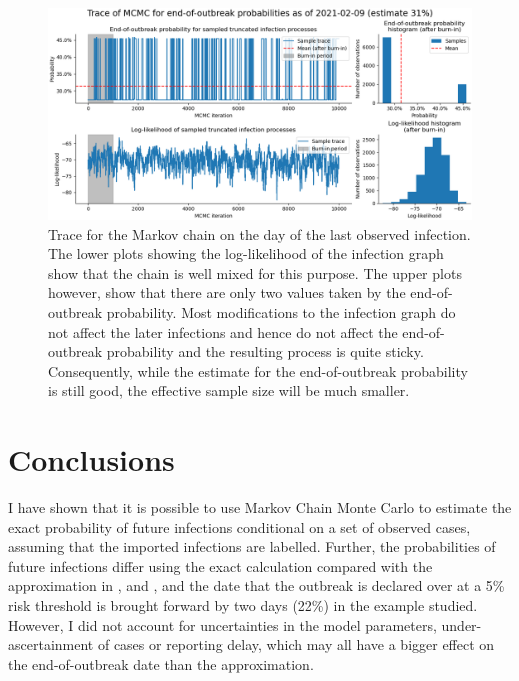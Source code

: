 \documentclass{article}
\begin{document}
\begin{figure}[p]
\includegraphics[width=\textwidth]{trace_28.png}
\centering
\caption{Trace for the Markov chain on the day of the last observed infection. The lower plots showing the log-likelihood of the infection graph show that the chain is well mixed for this purpose. The upper plots however, show that there are only two values taken by the end-of-outbreak probability. Most modifications to the infection graph do not affect the later infections and hence do not affect the end-of-outbreak probability and the resulting process is quite sticky. Consequently, while the estimate for the end-of-outbreak probability is still good, the effective sample size will be much smaller.}
\label{fig:mcmc-example-trace}
\end{figure}

\section{Conclusions}
I have shown that it is possible to use Markov Chain Monte Carlo to estimate the exact probability of future infections conditional on a set of observed cases, assuming that the imported infections are labelled. Further, the probabilities of future infections differ using the exact calculation compared with the approximation in \cite{Akhmetzhanov2021}, \cite{Linton2021} and \cite{Nishiura2016}, and the date that the outbreak is declared over at a 5\% risk threshold is brought forward by two days (22\%) in the example studied. However, I did not account for uncertainties in the model parameters, under-ascertainment of cases or reporting delay, which may all have a bigger effect on the end-of-outbreak date than the approximation.
\end{document}

